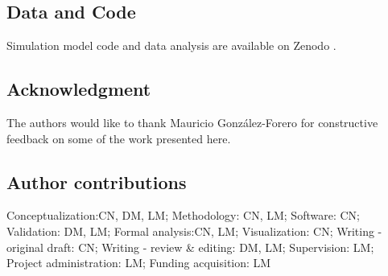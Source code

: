 \subsection{Data and Code}
Simulation model code and data analysis are available on Zenodo \parencite{christophnetz_2026_19204638}.

\subsection{Acknowledgment}
The authors would like to thank Mauricio González-Forero for constructive feedback on some of the work presented here.

\subsection{Author contributions}
Conceptualization:CN, DM, LM; Methodology: CN, LM; Software: CN; Validation: DM, LM; Formal analysis:CN, LM; Visualization: CN; Writing - original draft: CN; Writing - review \& editing: DM, LM;  Supervision: LM; Project administration: LM; Funding acquisition: LM

